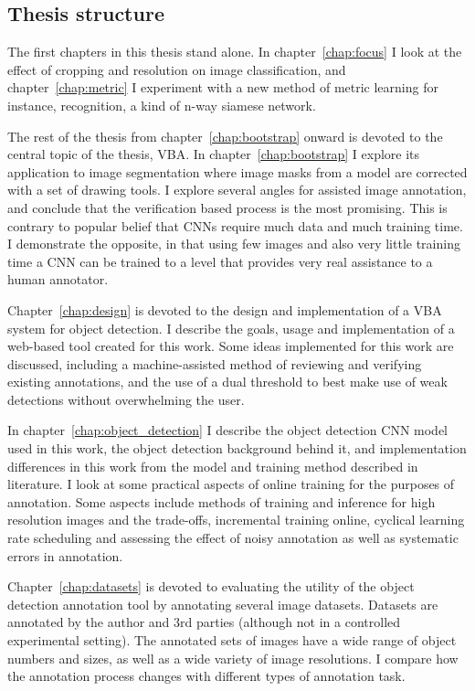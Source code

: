 \subsection {Thesis structure} 

The first chapters in this thesis stand alone. In chapter~\ref{chap:focus} I look at the effect of cropping and resolution on image classification, and chapter~\ref{chap:metric} I experiment with a new method of metric learning for instance, recognition, a kind of n-way siamese network. 

The rest of the thesis from chapter~\ref{chap:bootstrap} onward is devoted to the central topic of the thesis, \gls{VBA}. In chapter~\ref{chap:bootstrap} I explore its application to image segmentation where image masks from a model are corrected with a set of drawing tools. I explore several angles for assisted image annotation, and conclude that the verification based process is the most promising. This is contrary to popular belief that \gls{CNN}s require much data and much training time. I demonstrate the opposite, in that using few images and also very little training time a \gls{CNN} can be trained to a level that provides very real assistance to a human annotator. 

Chapter~\ref{chap:design} is devoted to the design and implementation of a \gls{VBA} system for object detection. I describe the goals, usage and implementation of a web-based tool created for this work. Some ideas implemented for this work are discussed, including a machine-assisted method of reviewing and verifying existing annotations, and the use of a dual threshold to best make use of weak detections without overwhelming the user.

In chapter~\ref{chap:object_detection} I describe the object detection \gls{CNN} model used in this work, the object detection background behind it, and implementation differences in this work from the model and training method described in literature. I look at some practical aspects of online training for the purposes of annotation. Some aspects include methods of training and inference for high resolution images and the trade-offs, incremental training online, cyclical learning rate scheduling and assessing the effect of noisy annotation as well as systematic errors in annotation. 

Chapter~\ref{chap:datasets} is devoted to evaluating the utility of the object detection annotation tool by annotating several image datasets. Datasets are annotated by the author and 3rd parties (although not in a controlled experimental setting). The annotated sets of images have a wide range of object numbers and sizes, as well as a wide variety of image resolutions. I compare how the annotation process changes with different types of annotation task. 

